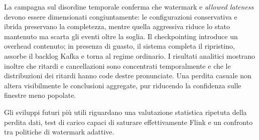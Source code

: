 \documentclass[conference]{IEEEtran}
\begin{document}
La campagna sul disordine temporale conferma che watermark e \textit{allowed lateness} devono essere dimensionati congiuntamente: le configurazioni conservativa e ibrida preservano la completezza, mentre quella aggressiva riduce lo stato mantenuto ma scarta gli eventi oltre la soglia. Il checkpointing introduce un overhead contenuto; in presenza di guasto, il sistema completa il ripristino, assorbe il backlog Kafka e torna al regime ordinario. I risultati analitici mostrano inoltre che ritardi e cancellazioni sono concentrati temporalmente e che le distribuzioni dei ritardi hanno code destre pronunciate. Una perdita casuale non altera visibilmente le conclusioni aggregate, pur riducendo la confidenza sulle finestre meno popolate.

Gli sviluppi futuri più utili riguardano una valutazione statistica ripetuta della perdita dati, test di carico capaci di saturare effettivamente Flink e un confronto tra politiche di watermark adattive.

\clearpage
\onecolumn
\end{document}
